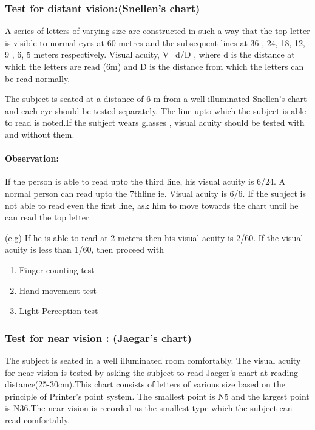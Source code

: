 \documentclass[a4paper,12pt,openany,oneside]{book}
\begin{document}
		\subsubsection*{Test for distant vision:(Snellen's chart)}
		A series of letters of varying size are constructed in such a way that the top letter is visible to normal eyes at 60 metres and the subsequent lines at 36 , 24, 18, 12, 9 , 6, 5 meters respectively. Visual acuity, V=d/D , where d is the distance at which the letters are read (6m) and D is the distance from which the letters can be read normally.
		\par
		The subject is seated at a distance of 6 m from a well illuminated Snellen's chart and each eye should be tested separately. The line upto which the subject is able to read is noted.If the subject wears glasses , visual acuity should be tested with and without them.
		\paragraph{Observation:}
		If the person is able to read upto the third line, his visual acuity is 6/24. A normal person can read upto the 7thline ie. Visual acuity is 6/6. If the subject is not able to read even the first line, ask him to move towards the chart until he can read the top letter.
		\par
		(e.g) If he is able to read at 2 meters then his visual acuity is 2/60. If the visual acuity is less than 1/60, then proceed with
		\begin{enumerate}
\item{Finger counting test}
\item{Hand movement test}
\item{Light Perception test}
		\end{enumerate}

		\subsubsection*{Test for near vision : (Jaegar’s chart)}
			The subject is seated in a well illuminated room comfortably. The visual acuity for near vision is tested by asking the subject to read Jaeger's chart at reading distance(25-30cm).This chart consists of letters of various size based on the principle of  Printer’s point system. The smallest point is N5 and the largest point is N36.The near vision is recorded as the smallest type which the subject can read comfortably.
\end{document}

